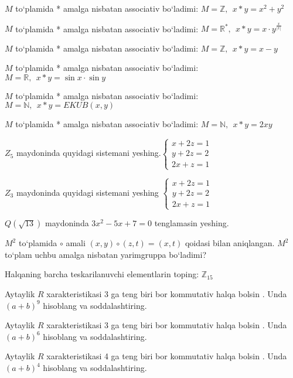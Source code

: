 \(M\) to`plamida * amalga nisbatan associativ bo`ladimi: \(M\mathbb{= Z},\ \ x*y = x^{2} + y^{2}\)

\(M\) to`plamida * amalga nisbatan associativ bo`ladimi: \(M = \mathbb{R}^{*},\ \ x*y = x \cdot y^{\frac{x}{|x|}}\)

\(M\) to`plamida * amalga nisbatan associativ bo`ladimi: \(M\mathbb{= Z},\ \ x*y = x - y\)

\(M\) to`plamida * amalga nisbatan associativ bo`ladimi: \(M\mathbb{= R},\ \ x*y = \sin x \cdot \sin y\)

\(M\) to`plamida * amalga nisbatan associativ bo`ladimi: \(M\mathbb{= N},\ \ x*y = EKUB(x,y)\)

\(M\) to`plamida * amalga nisbatan associativ bo`ladimi: \(M\mathbb{= N},\ \ x*y = 2xy\)

\(Z_{5}\) maydoninda quyidagi sistemani yeshing.\(\left\{ \begin{matrix}
x + 2z = 1 \\
y + 2z = 2 \\
2x + z = 1
\end{matrix} \right.\ \)

\(Z_{3}\) maydoninda quyidagi sistemani yeshing \(\left\{ \begin{matrix}
x + 2z = 1 \\
y + 2z = 2 \\
2x + z = 1
\end{matrix} \right.\ \)

\(Q(\sqrt{13})\) maydoninda \(3x^{2} - 5x + 7 = 0\) tenglamasin yeshing.

\(M^{2}\) to`plamida \(\circ\) amali \((x,y) \circ (z,t) = (x,t)\) qoidasi bilan aniqlangan. \(M^{2}\) to`plam uchbu amalga nisbatan yarimgruppa bo`ladimi?

Halqaning barcha teskarilanuvchi elementlarin toping: \(\mathbb{Z}_{15}\)

Aytaylik \(R\) xarakteristikasi 3 ga teng biri bor kommutativ halqa bo\textquotesingle lsin . Unda \((a + b)^{9}\) hisoblang va soddalashtiring.

Aytaylik \(R\) xarakteristikasi 3 ga teng biri bor kommutativ halqa bo\textquotesingle lsin . Unda \((a + b)^{6}\) hisoblang va soddalashtiring.

Aytaylik \(R\) xarakteristikasi 4 ga teng biri bor kommutativ halqa bo\textquotesingle lsin . Unda \((a + b)^{4}\) hisoblang va soddalashtiring.